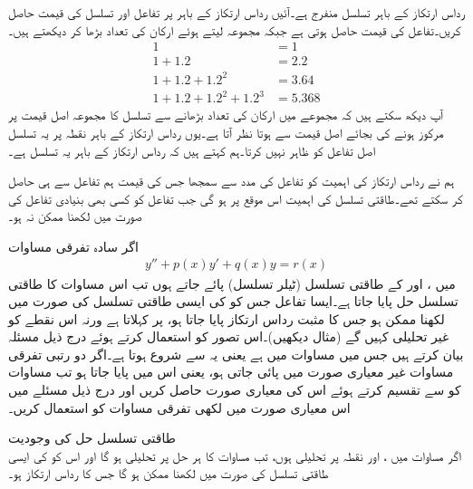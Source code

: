 رداس ارتکاز کے باہر تسلسل منفرج ہے۔آئیں رداس ارتکاز کے باہر  پر تفاعل اور تسلسل کی قیمت حاصل کریں۔تفاعل کی قیمت  حاصل ہوتی ہے جبکہ مجموعہ لیتے ہوئے ارکان کی تعداد بڑھا کر دیکھتے ہیں۔ 
\begin{align*}
1&=1 \\
1+1.2&=2.2\\
1+1.2+1.2^2&=3.64\\
1+1.2+1.2^2+1.2^3&=5.368
\end{align*}
آپ دیکھ سکتے ہیں کہ مجموعے میں ارکان کی تعداد بڑھانے سے تسلسل کا مجموعہ اصل قیمت پر مرکوز ہونے کی بجائے اصل قیمت سے  ہوتا نظر آتا ہے۔یوں رداس ارتکاز کے باہر نقطہ  پر یہ تسلسل اصل تفاعل کو ظاہر نہیں کرتا۔ہم کہتے ہیں کہ رداس ارتکاز کے باہر یہ تسلسل  ہے۔

ہم نے رداس ارتکاز کی اہمیت کو تفاعل  کی مدد سے سمجھا جس کی قیمت ہم تفاعل سے ہی حاصل کر سکتے تھے۔طاقتی تسلسل کی اہمیت اس موقع پر ہو گی جب تفاعل کو کسی بھی بنیادی تفاعل کی صورت میں لکھنا ممکن نہ ہو۔


اگر سادہ تفرقی مساوات
\begin{align}\label{مساوات_بیسل_معیاری_تفرقی_مساوات_الف}
y''+p(x)y'+q(x)y=r(x)
\end{align}
میں ،  اور  کے طاقتی تسلسل (ٹیلر تسلسل) پائے جاتے ہوں تب اس مساوات کا طاقتی تسلسل حل پایا جاتا ہے۔ایسا تفاعل  جس کو  کی ایسی طاقتی تسلسل کی صورت میں لکھنا ممکن ہو جس کا مثبت رداس ارتکاز پایا جاتا ہو،  پر  کہلاتا ہے ورنہ اس نقطے کو غیر تحلیلی کہیں گے (مثال  دیکھیں)۔اس تصور کو استعمال کرتے ہوئے درج ذیل مسئلہ بیان کرتے ہیں جس میں مساوات   میں ہے یعنی یہ  سے شروع ہوتا ہے۔اگر دو رتبی تفرقی مساوات غیر معیاری صورت میں پائی جاتی ہو، یعنی اس میں  پایا جاتا ہو تب مساوات کو  سے تقسیم کرتے ہوئے اس کی معیاری صورت حاصل کریں اور درج ذیل مسئلے میں اس معیاری صورت میں لکھی تفرقی مساوات کو استعمال کریں۔

\quad طاقتی تسلسل حل کی وجودیت\\
اگر مساوات  میں ،  اور  نقطہ  پر تحلیلی ہوں، تب مساوات  کا ہر حل  پر تحلیلی ہو گا اور اس کو  کی ایسی طاقتی تسلسل کی صورت میں لکھنا ممکن ہو گا جس کا رداس ارتکاز  ہو۔

